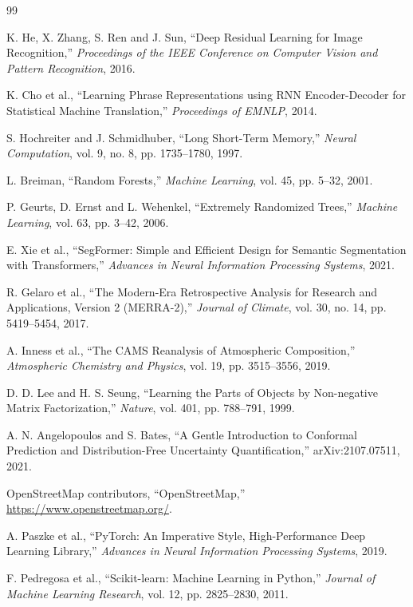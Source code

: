 \documentclass[11pt,a4paper,oneside]{report}
\begin{document}
\begin{thebibliography}{99}

K. He, X. Zhang, S. Ren and J. Sun,
``Deep Residual Learning for Image Recognition,''
\emph{Proceedings of the IEEE Conference on Computer Vision and Pattern
Recognition}, 2016.

K. Cho et al.,
``Learning Phrase Representations using RNN Encoder-Decoder for Statistical
Machine Translation,''
\emph{Proceedings of EMNLP}, 2014.

S. Hochreiter and J. Schmidhuber,
``Long Short-Term Memory,''
\emph{Neural Computation}, vol. 9, no. 8, pp. 1735--1780, 1997.

L. Breiman,
``Random Forests,''
\emph{Machine Learning}, vol. 45, pp. 5--32, 2001.

P. Geurts, D. Ernst and L. Wehenkel,
``Extremely Randomized Trees,''
\emph{Machine Learning}, vol. 63, pp. 3--42, 2006.

E. Xie et al.,
``SegFormer: Simple and Efficient Design for Semantic Segmentation with
Transformers,''
\emph{Advances in Neural Information Processing Systems}, 2021.

R. Gelaro et al.,
``The Modern-Era Retrospective Analysis for Research and Applications, Version
2 (MERRA-2),''
\emph{Journal of Climate}, vol. 30, no. 14, pp. 5419--5454, 2017.

A. Inness et al.,
``The CAMS Reanalysis of Atmospheric Composition,''
\emph{Atmospheric Chemistry and Physics}, vol. 19, pp. 3515--3556, 2019.

D. D. Lee and H. S. Seung,
``Learning the Parts of Objects by Non-negative Matrix Factorization,''
\emph{Nature}, vol. 401, pp. 788--791, 1999.

A. N. Angelopoulos and S. Bates,
``A Gentle Introduction to Conformal Prediction and Distribution-Free
Uncertainty Quantification,''
arXiv:2107.07511, 2021.

OpenStreetMap contributors,
``OpenStreetMap,''
\url{https://www.openstreetmap.org/}.

A. Paszke et al.,
``PyTorch: An Imperative Style, High-Performance Deep Learning Library,''
\emph{Advances in Neural Information Processing Systems}, 2019.

F. Pedregosa et al.,
``Scikit-learn: Machine Learning in Python,''
\emph{Journal of Machine Learning Research}, vol. 12, pp. 2825--2830, 2011.

\end{thebibliography}
\end{document}
